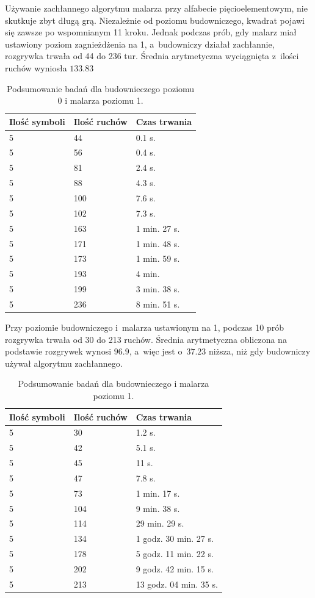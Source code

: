 \documentclass[document]{xmgr}
\begin{document}
Używanie zachłannego algorytmu malarza przy alfabecie pięcioelementowym,  nie skutkuje zbyt długą grą. Niezależnie od poziomu budowniczego, kwadrat pojawi się zawsze po wspomnianym 11 kroku. Jednak podczas prób, gdy malarz miał ustawiony poziom zagnieżdżenia na 1, a~budowniczy działał zachłannie, rozgrywka trwała od 44 do 236 tur. Średnia arytmetyczna wyciągnięta z~ilości ruchów wyniosła $133.83$

\begin{table}[tbh]
    \centering
	\begin{tabular}{|l|l|l|} \hline
	Ilość symboli & Ilość ruchów & Czas trwania \\ \hline
	5 & 44 & 0.1 s.\\ \hline
	5 & 56 & 0.4 s.\\ \hline
	5 & 81 & 2.4 s.\\ \hline
	5 & 88 & 4.3 s.\\ \hline
	5 & 100 & 7.6 s.\\ \hline
	5 & 102 & 7.3 s.\\ \hline
	5 & 163 & 1 min. 27 s. \\ \hline
	5 & 171 & 1 min. 48 s. \\ \hline
	5 & 173 & 1 min. 59 s. \\ \hline
	5 & 193 & 4 min. \\ \hline
	5 & 199 & 3 min. 38 s.\\ \hline
	5 & 236 & 8 min. 51 s. \\ \hline
	\end{tabular}
	\caption{Podsumowanie badań dla budownieczego poziomu 0 i malarza poziomu 1.}
	\label{fig:builder0Painter1Table}
\end{table}


Przy poziomie budowniczego i~malarza ustawionym na 1, podczas 10 prób rozgrywka trwała od 30 do 213 ruchów. Średnia arytmetyczna obliczona na podstawie rozgrywek wynosi $96.9$, a~więc jest o~$37.23$ niższa, niż gdy budowniczy używał algorytmu zachłannego. 

\begin{table}[tbh]
    \centering
	\begin{tabular}{|l|l|l|} \hline
	Ilość symboli & Ilość ruchów & Czas trwania \\ \hline
	5 & 30 & 1.2 s. \\ \hline	
	5 & 42 & 5.1 s. \\ \hline
	5 & 45 & 11 s. \\ \hline	
	5 & 47 & 7.8 s. \\ \hline
	5 & 73 & 1 min. 17 s. \\ \hline
	5 & 104 & 9 min. 38 s. \\ \hline
	5 & 114 & 29 min. 29 s. \\ \hline
	5 & 134 & 1 godz. 30 min. 27 s.  \\ \hline
	5 & 178 & 5 godz. 11 min. 22 s. \\ \hline
	5 & 202 & 9 godz. 42 min. 15 s. \\ \hline
	5 & 213 & 13 godz. 04 min. 35 s. \\ \hline
	\end{tabular}
	\caption{Podsumowanie badań dla budownieczego i malarza poziomu 1.}
	\label{fig:builder1Painter1Table}
\end{table}
\end{document}
